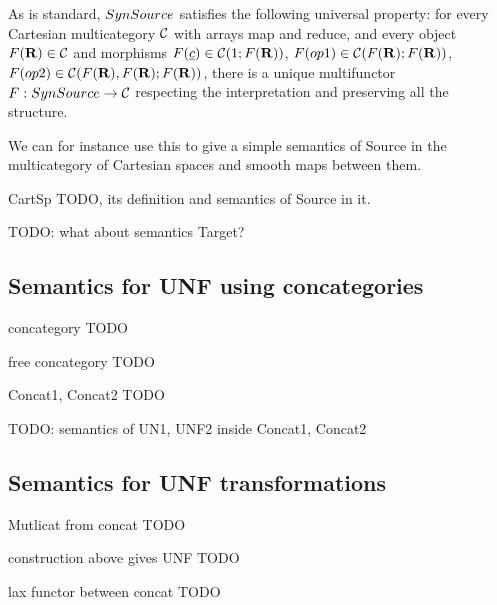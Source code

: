 As is standard, $SynSource$ satisfies the following universal property: 
for every Cartesian multicategory $\mathcal{C}$ with arrays map and reduce,
and every object $F(\mathbf{R})\in\mathcal{C}$ and morphisms $F(\underline{c})\in\mathcal{C}(1;F(\mathbf{R}))$, 
$F(op1)\in\mathcal{C}(F(\mathbf{R});F(\mathbf{R}))$, $F(op2)\in\mathcal{C}(F(\mathbf{R}),F(\mathbf{R});F(\mathbf{R}))$, there is a unique
multifunctor $F:SynSource\to\mathcal{C}$ respecting the interpretation and preserving all the structure.

We can for instance use this to give a simple semantics of Source 
in the multicategory of Cartesian spaces and smooth maps between them. 

\begin{definition}{CartSp}
    TODO, its definition and semantics of Source in it.
\end{definition}

TODO: what about semantics Target?

\subsection{Semantics for UNF using concategories} %
\label{sub:Semantics for UNF using concategories}

\begin{definition}{concategory}
    TODO
\end{definition}

\begin{definition}{free concategory}
    TODO
\end{definition}

\begin{example}{Concat1, Concat2}
    TODO
\end{example}

TODO: semantics of UN1, UNF2 inside Concat1, Concat2

\subsection{Semantics for UNF transformations} %
\label{sub:Semantics for UNF transformations}

\begin{definition}{Mutlicat from concat}
    TODO
\end{definition}

\begin{proposition}{construction above gives UNF}
    TODO
\end{proposition}

\begin{definition}{lax functor between concat}
    TODO
\end{definition}

